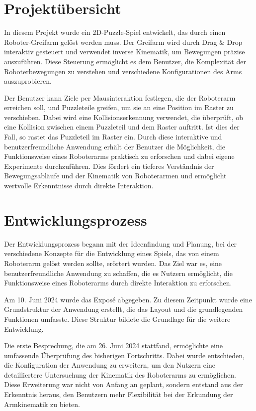 \documentclass[12pt]{article}
\begin{document}
    \section{Projektübersicht}
        In diesem Projekt wurde ein 2D-Puzzle-Spiel entwickelt, das durch einen Roboter-Greifarm gelöst werden
        muss. Der Greifarm wird durch Drag & Drop interaktiv gesteuert und verwendet inverse Kinematik, um
        Bewegungen präzise auszuführen. Diese Steuerung ermöglicht es dem Benutzer, die Komplexität der
        Roboterbewegungen zu verstehen und verschiedene Konfigurationen des Arms auszuprobieren.

        Der Benutzer kann Ziele per Mausinteraktion festlegen, die der Roboterarm erreichen soll, und Puzzleteile
        greifen, um sie an eine Position im Raster zu verschieben. Dabei wird eine Kollisionserkennung verwendet,
        die überprüft, ob eine Kollision zwischen einem Puzzleteil und dem Raster auftritt. Ist dies der Fall, so
        rastet das Puzzleteil im Raster ein. Durch diese interaktive und benutzerfreundliche Anwendung erhält der
        Benutzer die Möglichkeit, die Funktionsweise eines Roboterarms praktisch zu erforschen und dabei eigene
        Experimente durchzuführen. Dies fördert ein tieferes Verständnis der Bewegungsabläufe und der Kinematik
        von Roboterarmen und ermöglicht wertvolle Erkenntnisse durch direkte Interaktion.

    \section{Entwicklungsprozess}
        Der Entwicklungsprozess begann mit der Ideenfindung und Planung, bei der verschiedene Konzepte für die
        Entwicklung eines Spiels, das von einem Roboterarm gelöst werden sollte, erörtert wurden. Das Ziel war es,
        eine benutzerfreundliche Anwendung zu schaffen, die es Nutzern ermöglicht, die Funktionsweise eines
        Roboterarms durch direkte Interaktion zu erforschen.

        Am 10. Juni 2024 wurde das Exposé abgegeben. Zu diesem Zeitpunkt wurde eine Grundstruktur der Anwendung
        erstellt, die das Layout und die grundlegenden Funktionen umfasste. Diese Struktur bildete die Grundlage
        für die weitere Entwicklung.

        Die erste Besprechung, die am 26. Juni 2024 stattfand, ermöglichte eine umfassende Überprüfung des
        bisherigen Fortschritts. Dabei wurde entschieden, die Konfiguration der Anwendung zu erweitern, um den
        Nutzern eine detailliertere Untersuchung der Kinematik des Roboterarms zu ermöglichen. Diese Erweiterung
        war nicht von Anfang an geplant, sondern entstand aus der Erkenntnis heraus, den Benutzern mehr
        Flexibilität bei der Erkundung der Armkinematik zu bieten.
\end{document}
